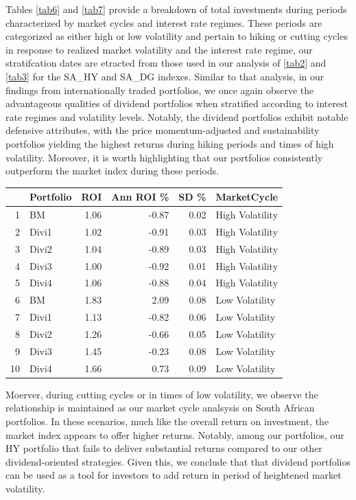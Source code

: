 \documentclass[11pt,preprint, authoryear]{elsarticle}
\let\origtable\table
\let\endorigtable\endtable
\renewenvironment{table}[1][2] {
    \expandafter\origtable\expandafter[H]
} {
    \endorigtable
}
\numberwithin{equation}{section}
\numberwithin{figure}{section}
\numberwithin{table}{section}
\begin{document}
Tables \ref{tab6} and \ref{tab7} provide a breakdown of total
investments during periods characterized by market cycles and interest
rate regimes. These periods are categorized as either high or low
volatility and pertain to hiking or cutting cycles in response to
realized market volatility and the interest rate regime, our
stratifcation dates are etracted from those used in our analysis of
\ref{tab2} and \ref{tab3} for the SA\_HY and SA\_DG indexes. Similar to
that analysis, in our findings from internationally traded portfolios,
we once again observe the advantageous qualities of dividend portfolios
when stratified according to interest rate regimes and volatility
levels. Notably, the dividend portfolios exhibit notable defensive
attributes, with the price momentum-adjusted and sustainability
portfolios yielding the highest returns during hiking periods and times
of high volatility. Moreover, it is worth highlighting that our
portfolios consistently outperform the market index during these
periods.

\begin{table}[H]
\centering
\begin{tabular}{rlrrrl}
  \hline
 & Portfolio & ROI & Ann ROI \% & SD \% & MarketCycle \\ 
  \hline
1 & BM & 1.06 & -0.87 & 0.02 & High Volatility  \\ 
  2 & Divi1 & 1.02 & -0.91 & 0.03 & High Volatility  \\ 
  3 & Divi2 & 1.04 & -0.89 & 0.03 & High Volatility  \\ 
  4 & Divi3 & 1.00 & -0.92 & 0.01 & High Volatility  \\ 
  5 & Divi4 & 1.06 & -0.88 & 0.04 & High Volatility  \\ 
  6 & BM & 1.83 & 2.09 & 0.08 & Low Volatility  \\ 
  7 & Divi1 & 1.13 & -0.82 & 0.06 & Low Volatility  \\ 
  8 & Divi2 & 1.26 & -0.66 & 0.05 & Low Volatility  \\ 
  9 & Divi3 & 1.45 & -0.23 & 0.08 & Low Volatility  \\ 
  10 & Divi4 & 1.66 & 0.73 & 0.09 & Low Volatility  \\ 
   \hline
\end{tabular}
\caption{Market Cycle Perforomance \label{tab6} } 
\end{table}

Moerver, during cutting cycles or in times of low volatility, we observe
the relationship is maintained as our market cycle analsysis on South
African portfolios. In these scenarios, much like the overall return on
investment, the market index appears to offer higher returns. Notably,
among our portfolios, our HY portfolio that fails to deliver substantial
returns compared to our other dividend-oriented strategies. Given this,
we conclude that that dividend portfolios can be used as a tool for
investors to add return in period of heightened market volatility.
\end{document}
